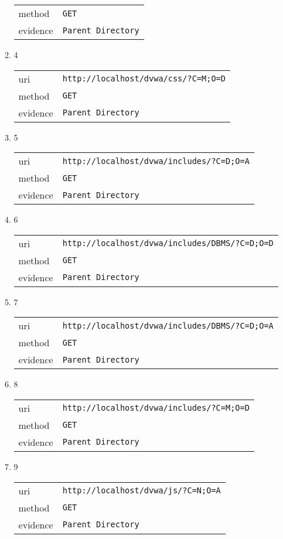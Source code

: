 \documentclass[10pt]{article}
\begin{document}
\begin{itemize}
\begin{enumerate}
\begin{tabular}{| l | p{12cm}}
method & \texttt{GET} \\
evidence & \texttt{Parent Directory} \\
\end{tabular}
\item[] 4
\begin{tabular}{| l | p{12cm}}
uri & \texttt{http://localhost/dvwa/css/?C=M;O=D} \\
method & \texttt{GET} \\
evidence & \texttt{Parent Directory} \\
\end{tabular}
\item[] 5
\begin{tabular}{| l | p{12cm}}
uri & \texttt{http://localhost/dvwa/includes/?C=D;O=A} \\
method & \texttt{GET} \\
evidence & \texttt{Parent Directory} \\
\end{tabular}
\item[] 6
\begin{tabular}{| l | p{12cm}}
uri & \texttt{http://localhost/dvwa/includes/DBMS/?C=D;O=D} \\
method & \texttt{GET} \\
evidence & \texttt{Parent Directory} \\
\end{tabular}
\item[] 7
\begin{tabular}{| l | p{12cm}}
uri & \texttt{http://localhost/dvwa/includes/DBMS/?C=D;O=A} \\
method & \texttt{GET} \\
evidence & \texttt{Parent Directory} \\
\end{tabular}
\item[] 8
\begin{tabular}{| l | p{12cm}}
uri & \texttt{http://localhost/dvwa/includes/?C=M;O=D} \\
method & \texttt{GET} \\
evidence & \texttt{Parent Directory} \\
\end{tabular}
\item[] 9
\begin{tabular}{| l | p{12cm}}
uri & \texttt{http://localhost/dvwa/js/?C=N;O=A} \\
method & \texttt{GET} \\
evidence & \texttt{Parent Directory} \\

\end{tabular}
\end{enumerate}
\end{itemize}
\end{document}
